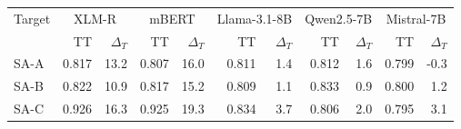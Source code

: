 \begin{tabular}{lrrrrrrrrrr}
\toprule
Target & \multicolumn{2}{c}{XLM-R} & \multicolumn{2}{c}{mBERT} & \multicolumn{2}{c}{Llama-3.1-8B} & \multicolumn{2}{c}{Qwen2.5-7B} & \multicolumn{2}{c}{Mistral-7B} \\
 & TT & $\Delta_T$ & TT & $\Delta_T$ & TT & $\Delta_T$ & TT & $\Delta_T$ & TT & $\Delta_T$ \\
\midrule
SA-A & 0.817 & 13.2 & 0.807 & 16.0 & 0.811 & 1.4 & 0.812 & 1.6 & 0.799 & -0.3 \\
SA-B & 0.822 & 10.9 & 0.817 & 15.2 & 0.809 & 1.1 & 0.833 & 0.9 & 0.800 & 1.2 \\
SA-C & 0.926 & 16.3 & 0.925 & 19.3 & 0.834 & 3.7 & 0.806 & 2.0 & 0.795 & 3.1 \\
\bottomrule
\end{tabular}
